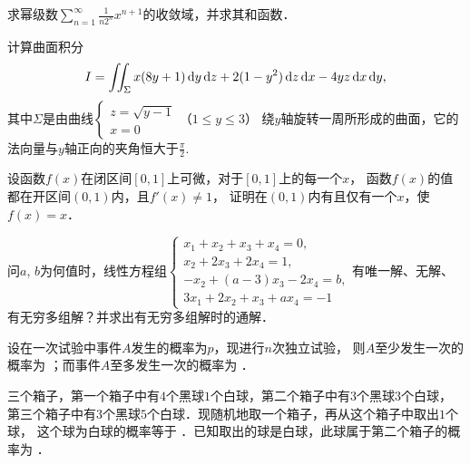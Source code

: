 \documentclass[plain,noanswer,medmath]{../../template/jnuexam}
\begin{document}

\begin{problem}
求幂级数$\sum_{n = 1}^{\infty}\frac{1}{n2^n}x^{n + 1}$的收敛域，并求其和函数．
\end{problem}



\begin{problem}
计算曲面积分
$$I = \iint_{\Sigma}x(8y + 1)\mathop{}\!\mathrm{d} y\mathop{}\!\mathrm{d} z + 2(1 - y^2)\mathop{}\!\mathrm{d} z\mathop{}\!\mathrm{d} x - 4yz\mathop{}\!\mathrm{d} x\mathop{}\!\mathrm{d} y,$$
其中$\Sigma$是由曲线$\begin{cases}
  z = \sqrt{y - 1} \\
  x = 0
\end{cases}$（$1 \le y \le 3$）
绕$y$轴旋转一周所形成的曲面，它的法向量与$y$轴正向的夹角恒大于$\frac{\pi}{2}.$
\end{problem}



\begin{problem}
设函数$f(x)$在闭区间$[0,1]$上可微，对于$[0,1]$上的每一个$x$，
函数$f(x)$的值都在开区间$(0,1)$内，且$f'(x) \ne 1$，
证明在$(0,1)$内有且仅有一个$x$，使$f(x) = x$．
\end{problem}



\begin{problem}
问$a$, $b$为何值时，线性方程组$\begin{cases}
  x_1 + x_2 + x_3 + x_4 = 0, \\
  x_2 + 2x_3 + 2x_4 = 1, \\
  -x_2 + (a - 3)x_3 - 2x_4 = b, \\
  3x_1 + 2x_2 + x_3 + ax_4 = - 1
\end{cases}$有唯一解、无解、有无穷多组解？并求出有无穷多组解时的通解．
\end{problem}




\begin{problem}
设在一次试验中事件$A$发生的概率为$p$，现进行$n$次独立试验，
则$A$至少发生一次的概率为 \fillin{}；而事件$A$至多发生一次的概率为 \fillin{}．
\end{problem}


\begin{problem}
三个箱子，第一个箱子中有$4$个黑球$1$个白球，第二个箱子中有$3$个黑球$3$个白球，
第三个箱子中有$3$个黑球$5$个白球．现随机地取一个箱子，再从这个箱子中取出$1$个球，
这个球为白球的概率等于 \fillin{}．已知取出的球是白球，此球属于第二个箱子的概率为 \fillin{}．
\end{problem}
\end{document}
